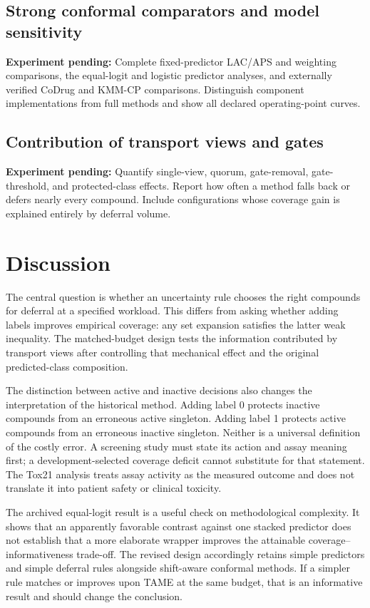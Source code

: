 \documentclass[11pt]{article}
\newcommand{\pending}[1]{\par\noindent\textbf{Experiment pending:} #1\par}
\begin{document}
\subsection{Strong conformal comparators and model sensitivity}
\pending{Complete fixed-predictor LAC/APS and weighting comparisons, the equal-logit and logistic predictor analyses, and externally verified CoDrug and KMM-CP comparisons. Distinguish component implementations from full methods and show all declared operating-point curves.}

\subsection{Contribution of transport views and gates}
\pending{Quantify single-view, quorum, gate-removal, gate-threshold, and protected-class effects. Report how often a method falls back or defers nearly every compound. Include configurations whose coverage gain is explained entirely by deferral volume.}

\section{Discussion}
The central question is whether an uncertainty rule chooses the right compounds for deferral at a specified workload. This differs from asking whether adding labels improves empirical coverage: any set expansion satisfies the latter weak inequality. The matched-budget design tests the information contributed by transport views after controlling that mechanical effect and the original predicted-class composition.

The distinction between active and inactive decisions also changes the interpretation of the historical method. Adding label 0 protects inactive compounds from an erroneous active singleton. Adding label 1 protects active compounds from an erroneous inactive singleton. Neither is a universal definition of the costly error. A screening study must state its action and assay meaning first; a development-selected coverage deficit cannot substitute for that statement. The Tox21 analysis treats assay activity as the measured outcome and does not translate it into patient safety or clinical toxicity.

The archived equal-logit result is a useful check on methodological complexity. It shows that an apparently favorable contrast against one stacked predictor does not establish that a more elaborate wrapper improves the attainable coverage--informativeness trade-off. The revised design accordingly retains simple predictors and simple deferral rules alongside shift-aware conformal methods. If a simpler rule matches or improves upon TAME at the same budget, that is an informative result and should change the conclusion.
\end{document}

